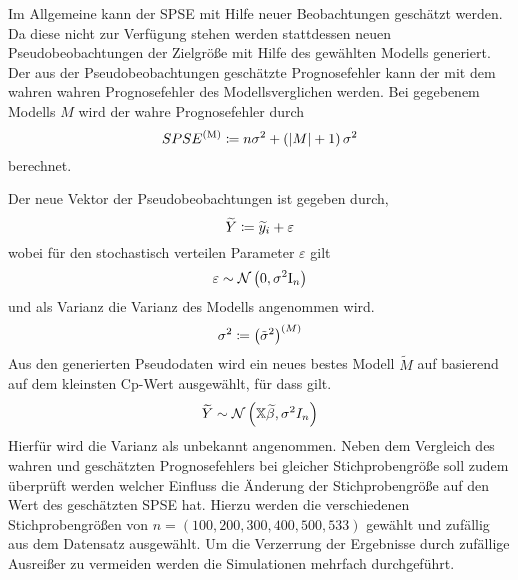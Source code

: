         Im Allgemeine kann der SPSE mit Hilfe neuer Beobachtungen geschätzt werden.\cite{Schumacher Skript}
        Da diese nicht zur Verfügung stehen werden stattdessen neuen Pseudobeobachtungen der Zielgröße mit Hilfe des gewählten Modells generiert.
        Der aus der Pseudobeobachtungen geschätzte Prognosefehler kann der mit dem wahren wahren Prognosefehler des Modellsverglichen werden.
        Bei gegebenem Modells $M$ wird der wahre Prognosefehler durch
        \[
            SPSE^{\mathrm{(M)}} \coloneqq  n \sigma^2 + \left( \left\vert M \right\vert+1 \right) \sigma^2
        \]
        berechnet.

        Der neue Vektor der Pseudobeobachtungen ist gegeben durch,
        \[
            \widetilde{Y} \coloneqq \widetilde{y}_i + \varepsilon
        \]
        wobei für den stochastisch verteilen Parameter $\varepsilon$ gilt
        \[
            \varepsilon \sim \mathcal{N} \left( 0,\sigma^2\mathrm{I}_n \right)
        \]
        und als Varianz die Varianz des Modells angenommen wird.
        \[
            \sigma^2 \coloneqq \left( \tilde{\sigma}^2 \right)^{(M)}
        \]
        Aus den generierten Pseudodaten wird ein neues bestes Modell $\widetilde{M}$ auf basierend auf dem kleinsten Cp-Wert ausgewählt, für dass gilt.
        \[
            \widetilde{Y} \sim \mathcal{N} \left( \mathbb{X}\widetilde{\beta}, \sigma^2 I_n \right)
        \]
        Hierfür wird die Varianz als unbekannt angenommen.
        Neben dem Vergleich des wahren und geschätzten Prognosefehlers bei gleicher Stichprobengröße soll zudem überprüft werden welcher Einfluss die Änderung der Stichprobengröße auf den Wert des geschätzten SPSE hat.
        Hierzu werden die verschiedenen Stichprobengrößen von $n = (100, 200, 300, 400, 500, 533)$ gewählt und zufällig aus dem Datensatz ausgewählt.
        Um die Verzerrung der Ergebnisse durch zufällige Ausreißer zu vermeiden werden die Simulationen mehrfach durchgeführt.



